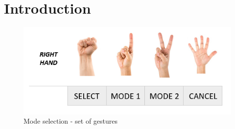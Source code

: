 \section{Introduction}
\begin{figure}[H]
	\includegraphics{mode_selection}
	\centering
	\caption{Mode selection - set of gestures}
	\label{fig:mode}
\end{figure}